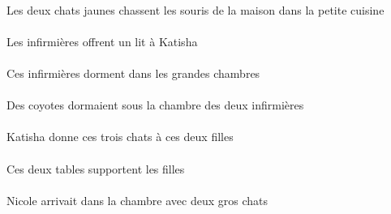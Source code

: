 \begin{exe}
\DEFDuErgP{}   \jauneDDuP{}   \chatDDuErgP{}    \DEFSgOblP{}   \petitCSgP{}   \cuisineCSgOblP{}   \DANSP{}   \DEFPlAbsP{}    \DEFSgOblP{}   \maisonDSgOblP{}   \DEP{}   \sourisAPlAbsP{}  \chasserVtPrsAPlP{}\\
Les deux chats jaunes chassent les souris de la maison dans la petite cuisine
\ex\gll
\DEFPlErg{}   \infirmiereBPlErg{}    \INDSgDat{}   \KatishaASgDat{}   \INDSgAbs{}   \litDSgAbs{}  \offrirVdPrsDSg{}\\
\DEFPlErgP{}   \infirmiereBPlErgP{}    \INDSgDatP{}   \KatishaASgDatP{}   \INDSgAbsP{}   \litDSgAbsP{}  \offrirVdPrsDSgP{}\\
Les infirmières offrent un lit à Katisha
\ex\gll
\DEMPlAbs{}   \infirmiereBPlAbs{}    \DEFPlObl{}   \grandBPl{}   \chambreBPlObl{}   \DANS{}  \dormirViPrsBPl{}\\
\DEMPlAbsP{}   \infirmiereBPlAbsP{}    \DEFPlOblP{}   \grandBPlP{}   \chambreBPlOblP{}   \DANSP{}  \dormirViPrsBPlP{}\\
Ces infirmières dorment dans les grandes chambres
\ex\gll
\DEFSgObl{}    \DEFDuObl{}   \infirmiereBDuObl{}   \DE{}   \chambreBSgObl{}   \SOUS{}   \INDPlAbs{}   \coyoteAPlAbs{}  \dormirViPstAPl{}\\
\DEFSgOblP{}    \DEFDuOblP{}   \infirmiereBDuOblP{}   \DEP{}   \chambreBSgOblP{}   \SOUSP{}   \INDPlAbsP{}   \coyoteAPlAbsP{}  \dormirViPstAPlP{}\\
Des coyotes dormaient sous la chambre des deux infirmières
\ex\gll
\INDSgErg{}   \KatishaASgErg{}    \DEMDuDat{}   \filleCDuDat{}   \DEMPlAbs{}   \troisDPl{}   \chatDPlAbs{}  \donnerVdPrsDPl{}\\
\INDSgErgP{}   \KatishaASgErgP{}    \DEMDuDatP{}   \filleCDuDatP{}   \DEMPlAbsP{}   \troisDPlP{}   \chatDPlAbsP{}  \donnerVdPrsDPlP{}\\
Katisha donne ces trois chats à ces deux filles
\ex\gll
\DEMDuErg{}   \tableCDuErg{}   \DEFPlAbs{}   \filleCPlAbs{}  \supporterVtPrsCPl{}\\
\DEMDuErgP{}   \tableCDuErgP{}   \DEFPlAbsP{}   \filleCPlAbsP{}  \supporterVtPrsCPlP{}\\
Ces deux tables supportent les filles
\ex\gll
\INDDuObl{}   \grosDDu{}   \chatDDuObl{}   \AVEC{}   \INDSgAbs{}   \NicoleDSgAbs{}    \DEFSgObl{}   \chambreBSgObl{}   \DANS{}  \arriverViPstDSg{}\\
\INDDuOblP{}   \grosDDuP{}   \chatDDuOblP{}   \AVECP{}   \INDSgAbsP{}   \NicoleDSgAbsP{}    \DEFSgOblP{}   \chambreBSgOblP{}   \DANSP{}  \arriverViPstDSgP{}\\
Nicole arrivait dans la chambre avec deux gros chats

\end{exe}

